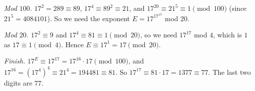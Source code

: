\emph{Mod $100$.} $17^2=289\equiv89$, $17^4\equiv89^2\equiv21$, and $17^{20}\equiv21^5\equiv1\pmod{100}$ (since $21^5=4084101$). So we need the exponent $E=17^{17^{17}}$ mod $20$.

\emph{Mod $20$.} $17^2\equiv9$ and $17^4\equiv81\equiv1\pmod{20}$, so we need $17^{17}$ mod $4$, which is $1$ as $17\equiv1\pmod4$. Hence $E\equiv17^1=17\pmod{20}$.

\emph{Finish.} $17^{E}\equiv17^{17}=17^{16}\cdot17\pmod{100}$, and $17^{16}=\left(17^4\right)^4\equiv21^4=194481\equiv81$. So $17^{17}\equiv81\cdot17=1377\equiv77$. The last two digits are $\boxed{77}$.

